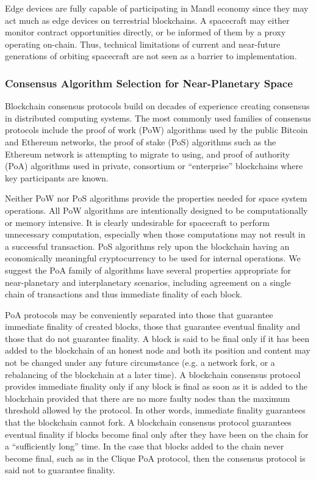 \documentclass[journal ]{new-aiaa}
\begin{document}
Edge devices are fully capable of participating in Mandl economy since they may act much as edge devices on terrestrial blockchains. A spacecraft may either monitor contract opportunities directly, or be informed of them by a proxy operating on-chain. Thus, technical limitations of current and near-future generations of orbiting spacecraft are not seen as a barrier to implementation.

\subsubsection{Consensus Algorithm Selection for Near-Planetary Space}

Blockchain consensus protocols build on decades of experience creating consensus in distributed computing systems. The most commonly used families of consensus protocols include the proof of work (PoW) algorithms used by the public Bitcoin and Ethereum networks, the proof of stake (PoS) algorithms such as the Ethereum network is attempting to migrate to using, and proof of authority (PoA) algorithms used in private, consortium or ``enterprise'' blockchains where key participants are known.

Neither PoW nor PoS algorithms provide the properties needed for space system operations. All PoW algorithms are intentionally designed to be computationally or memory intensive. It is clearly undesirable for spacecraft to perform unnecessary computation, especially when those computations may not result in a successful transaction. PoS algorithms rely upon the blockchain having an economically meaningful cryptocurrency to be used for internal operations. We suggest the PoA family of algorithms have several properties appropriate for near-planetary and interplanetary scenarios, including agreement on a single chain of transactions and thus immediate finality of each block.

PoA protocols may be conveniently separated into those that guarantee immediate finality of created blocks, those that guarantee eventual finality and those that do not guarantee finality. A block is said to be final only if it has been added to the blockchain of an honest node and both its position and content may not be changed under any future circumstance (e.g. a network fork, or a rebalancing of the blockchain at a later time). A blockchain consensus protocol provides immediate finality only if any block is final as soon as it is added to the blockchain provided that there are no more faulty nodes than the maximum threshold allowed by the protocol. In other words, immediate finality guarantees that the blockchain cannot fork. A blockchain consensus protocol guarantees eventual finality if blocks become final only after they have been on the chain for a ``sufficiently long'' time. In the case that blocks added to the chain never become final, such as in the Clique PoA protocol\cite{Szilagyi-Clique}, then the consensus protocol is said not to guarantee finality.
\end{document}
